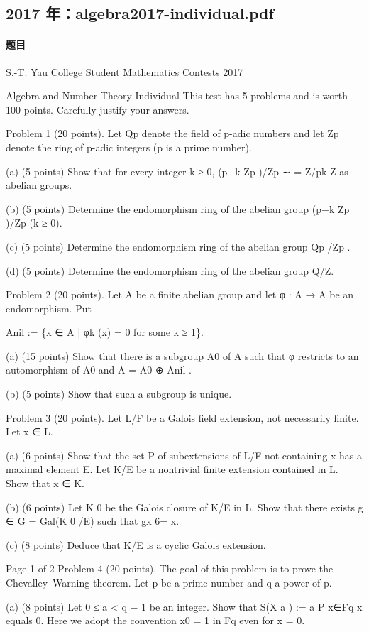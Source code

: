 \documentclass[UTF8,12pt]{ctexart}
\begin{document}
\subsection{2017 年：algebra2017-individual.pdf}
\paragraph{题目}
S.-T. Yau College Student Mathematics Contests 2017

Algebra and Number Theory Individual This test has 5 problems and is worth 100 points. Carefully justify your answers.

Problem 1 (20 points). Let Qp denote the field of p-adic numbers and let Zp denote the ring of p-adic integers (p is a prime number).

(a) (5 points) Show that for every integer k ≥ 0, (p−k Zp )/Zp ∼ = Z/pk Z as abelian groups.

(b) (5 points) Determine the endomorphism ring of the abelian group (p−k Zp )/Zp (k ≥ 0).

(c) (5 points) Determine the endomorphism ring of the abelian group Qp /Zp .

(d) (5 points) Determine the endomorphism ring of the abelian group Q/Z.

Problem 2 (20 points). Let A be a finite abelian group and let φ : A → A be an endomorphism. Put

Anil := \{x ∈ A | φk (x) = 0 for some k ≥ 1\}.

(a) (15 points) Show that there is a subgroup A0 of A such that φ restricts to an automorphism of A0 and A = A0 ⊕ Anil .

(b) (5 points) Show that such a subgroup is unique.

Problem 3 (20 points). Let L/F be a Galois field extension, not necessarily finite. Let x ∈ L.

(a) (6 points) Show that the set P of subextensions of L/F not containing x has a maximal element E. Let K/E be a nontrivial finite extension contained in L. Show that x ∈ K.

(b) (6 points) Let K 0 be the Galois closure of K/E in L. Show that there exists g ∈ G = Gal(K 0 /E) such that gx 6= x.

(c) (8 points) Deduce that K/E is a cyclic Galois extension.

Page 1 of 2 Problem 4 (20 points). The goal of this problem is to prove the Chevalley–Warning theorem. Let p be a prime number and q a power of p.

(a) (8 points) Let 0 ≤ a < q − 1 be an integer. Show that S(X a ) := a P x∈Fq x equals 0. Here we adopt the convention x0 = 1 in Fq even for x = 0.
\end{document}
